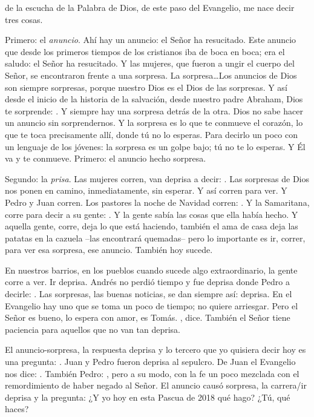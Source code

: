 \begin{body}
 de la escucha de la Palabra de Dios, de este paso del Evangelio, me nace decir tres cosas.

Primero: el \textit{anuncio}. Ahí hay un anuncio: el Señor ha resucitado. Este anuncio que desde los primeros tiempos de los cristianos iba de boca en boca; era el saludo: el Señor ha resucitado. Y las mujeres, que fueron a ungir el cuerpo del Señor, se encontraron frente a una sorpresa. La sorpresa\ldots Los anuncios de Dios son siempre sorpresas, porque nuestro Dios es el Dios de las sorpresas. Y así desde el inicio de la historia de la salvación, desde nuestro padre Abraham, Dios te sorprende: . Y siempre hay una sorpresa detrás de la otra. Dios no sabe hacer un anuncio sin sorprendernos. Y la sorpresa es lo que te conmueve el corazón, lo que te toca precisamente allí, donde tú no lo esperas. Para decirlo un poco con un lenguaje de los jóvenes: la sorpresa es un golpe bajo; tú no te lo esperas. Y Él va y te conmueve. Primero: el anuncio hecho sorpresa.

Segundo: la \textit{prisa}. Las mujeres corren, van deprisa a decir: . Las sorpresas de Dios nos ponen en camino, inmediatamente, sin esperar. Y así corren para ver. Y Pedro y Juan corren. Los pastores la noche de Navidad corren: . Y la Samaritana, corre para decir a su gente: . Y la gente sabía las cosas que ella había hecho. Y aquella gente, corre, deja lo que está haciendo, también el ama de casa deja las patatas en la cazuela –las encontrará quemadas– pero lo importante es ir, correr, para ver esa sorpresa, ese anuncio. También hoy sucede.

En nuestros barrios, en los pueblos cuando sucede algo extraordinario, la gente corre a ver. Ir deprisa. Andrés no perdió tiempo y fue deprisa donde Pedro a decirle: . Las sorpresas, las buenas noticias, se dan siempre así: deprisa. En el Evangelio hay uno que se toma un poco de tiempo; no quiere arriesgar. Pero el Señor es bueno, lo espera con amor, es Tomás. , dice. También el Señor tiene paciencia para aquellos que no van tan deprisa.

El anuncio-sorpresa, la respuesta deprisa y lo tercero que yo quisiera decir hoy es una pregunta: . Juan y Pedro fueron deprisa al sepulcro. De Juan el Evangelio nos dice: . También Pedro: , pero a su modo, con la fe un poco mezclada con el remordimiento de haber negado al Señor. El anuncio causó sorpresa, la carrera/ir deprisa y la pregunta: ¿Y yo hoy en esta Pascua de 2018 qué hago? ¿Tú, qué haces?
\end{body}

